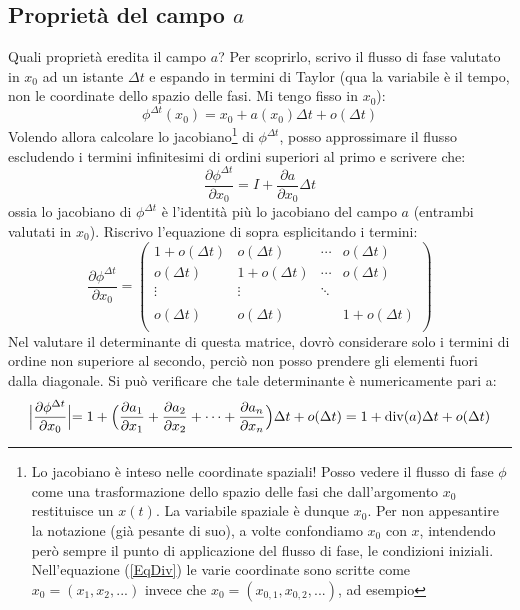 \documentclass[a4paper,openany]{article}
\begin{document}
	\subsection{Proprietà del campo $a$}
	Quali proprietà eredita il campo $a$? Per scoprirlo, scrivo il flusso di fase valutato in $x_{0}$ ad un istante $\Delta t$ e espando in termini di Taylor (qua la variabile è il tempo, non le coordinate dello spazio delle fasi. Mi tengo fisso in $x_{0}$):
	\begin{equation}
		\phi^{\Delta t}(x_{0}) = x_{0} + a(x_{0})\Delta t + o(\Delta t)
	\end{equation}
	Volendo allora calcolare lo jacobiano\footnote{Lo jacobiano è inteso nelle coordinate spaziali! Posso vedere il flusso di fase $\phi$ come una trasformazione dello spazio delle fasi che dall'argomento $x_{0}$ restituisce un $x(t)$. La variabile spaziale è dunque $x_{0}$. Per non appesantire la notazione (già pesante di suo), a volte confondiamo $x_{0}$ con $x$, intendendo però sempre il punto di applicazione del flusso di fase, le condizioni iniziali. Nell'equazione (\ref{EqDiv}) le varie coordinate sono scritte come $x_{0} = (x_{1}, x_{2}, ...)$ invece che $x_{0} = (x_{0,1}, x_{0,2}, ...)$, ad esempio} di $\phi^{\Delta t}$, posso approssimare il flusso escludendo i termini infinitesimi di ordini superiori al primo e scrivere che:
	$$
	\dfrac{\partial \phi^{\Delta t}}{\partial x_{0}} = I + \dfrac{\partial a}{\partial x_{0}}\Delta t
	$$
	ossia lo jacobiano di $\phi^{\Delta t }$ è l'identità più lo jacobiano del campo $a$ (entrambi valutati in $x_{0}$). Riscrivo l'equazione di sopra esplicitando i termini:
	\begin{equation}
		\dfrac{\partial \phi^{\Delta t}}{\partial x_{0}} = 
		\begin{pmatrix}
			1+ o(\Delta t) & o(\Delta t) & \cdots & o(\Delta t) \\
			o(\Delta t) & 1+ o(\Delta t) & \cdots &o(\Delta t) \\
			\vdots & \vdots &\ddots \\
			&&&\\
			o(\Delta t)  & o(\Delta t) & &1+o(\Delta t) \\
		\end{pmatrix}
	\end{equation}
	Nel valutare il determinante di questa matrice, dovrò considerare solo i termini di ordine non superiore al secondo, perciò non posso prendere gli elementi fuori dalla diagonale. Si può verificare che tale determinante è numericamente pari a:
	\begin{equation}
		\Bigl|\dfrac{\partial \phi^{\Delta t}}{\partial x_{0}}\Bigl| = 1+ \Bigl(\dfrac{\partial a_{1}}{\partial x_{1}} + \dfrac{\partial a_{2}}{\partial x_{2}}+ \cdots + \dfrac{\partial a_{n}}{\partial x_{n}}\Bigl)\Delta t + o(\Delta t) = 1 + \mbox{div}(a) \Delta t + o(\Delta t)
		\label{EqDiv}
	\end{equation}
\end{document}
